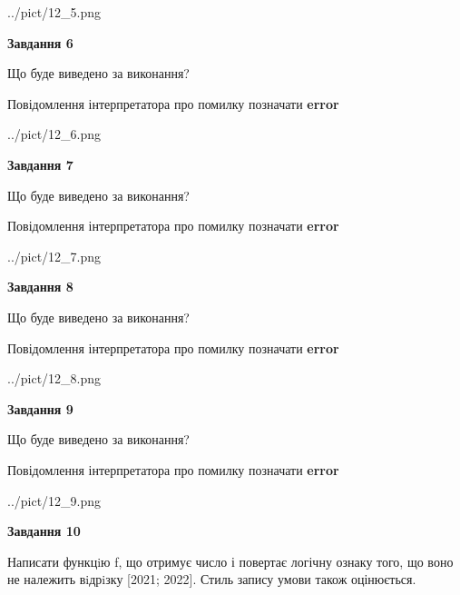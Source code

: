 \documentclass[12pt, ukrainian]{article}
\begin{document}
{\begin {large}
\begin{center}
	{../pict/12_5.png}
\end{center}
\newpage

{\begin {center}\textbf{Завдання 6}\end {center}}\par
Що буде виведено за виконання? \par
Повідомлення інтерпретатора про помилку позначати \textbf{error}

\begin{center}
	{../pict/12_6.png}
\end{center}
\newpage

{\begin {center}\textbf{Завдання 7}\end {center}}\par
Що буде виведено за виконання? \par
Повідомлення інтерпретатора про помилку позначати \textbf{error}

\begin{center}
	{../pict/12_7.png}
\end{center}
\newpage

{\begin {center}\textbf{Завдання 8}\end {center}}\par
Що буде виведено за виконання? \par
Повідомлення інтерпретатора про помилку позначати \textbf{error}

\begin{center}
	{../pict/12_8.png}
\end{center}
\newpage

{\begin {center}\textbf{Завдання 9}\end {center}}\par
Що буде виведено за виконання? \par
Повідомлення інтерпретатора про помилку позначати \textbf{error}

\begin{center}
	{../pict/12_9.png}
\end{center}
\newpage

{\begin {center}\textbf{Завдання 10}\end {center}}\par

Написати функцiю f, що отримує число і повертає логічну ознаку того, що воно не належить вiдрiзку [2021; 2022]. Стиль запису умови також оцінюється.\par
\newpage

\end {large}}
\end{document}
